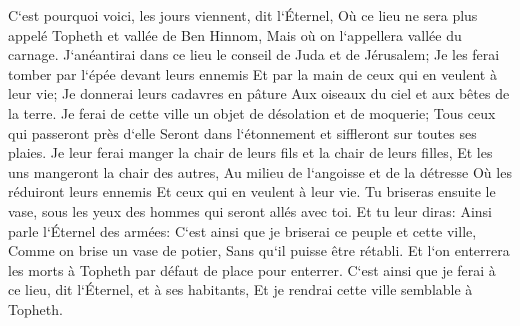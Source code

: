 \verse C`est pourquoi voici, les jours viennent, dit l`Éternel, Où ce lieu ne sera plus appelé Topheth et vallée de Ben Hinnom, Mais où on l`appellera vallée du carnage. 
\verse J`anéantirai dans ce lieu le conseil de Juda et de Jérusalem; Je les ferai tomber par l`épée devant leurs ennemis Et par la main de ceux qui en veulent à leur vie; Je donnerai leurs cadavres en pâture Aux oiseaux du ciel et aux bêtes de la terre. 
\verse Je ferai de cette ville un objet de désolation et de moquerie; Tous ceux qui passeront près d`elle Seront dans l`étonnement et siffleront sur toutes ses plaies. 
\verse Je leur ferai manger la chair de leurs fils et la chair de leurs filles, Et les uns mangeront la chair des autres, Au milieu de l`angoisse et de la détresse Où les réduiront leurs ennemis Et ceux qui en veulent à leur vie. 
\verse Tu briseras ensuite le vase, sous les yeux des hommes qui seront allés avec toi. 
\verse Et tu leur diras: Ainsi parle l`Éternel des armées: C`est ainsi que je briserai ce peuple et cette ville, Comme on brise un vase de potier, Sans qu`il puisse être rétabli. Et l`on enterrera les morts à Topheth par défaut de place pour enterrer. 
\verse C`est ainsi que je ferai à ce lieu, dit l`Éternel, et à ses habitants, Et je rendrai cette ville semblable à Topheth. 

